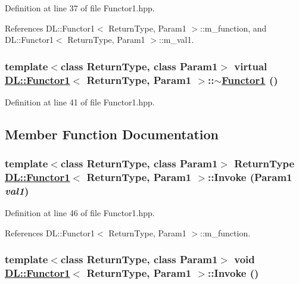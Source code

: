 Definition at line 37 of file Functor1.hpp.

References DL::Functor1$<$ Return\-Type, Param1 $>$::m\_\-function, and DL::Functor1$<$ Return\-Type, Param1 $>$::m\_\-val1.\hypertarget{classDL_1_1Functor1_a1}{
\subsubsection[$\sim$Functor1]{\setlength{\rightskip}{0pt plus 5cm}template$<$class Return\-Type, class Param1$>$ virtual \hyperlink{classDL_1_1Functor1}{DL::Functor1}$<$ Return\-Type, Param1 $>$::$\sim$\hyperlink{classDL_1_1Functor1}{Functor1} ()}}
\label{classDL_1_1Functor1_a1}




Definition at line 41 of file Functor1.hpp.

\subsection{Member Function Documentation}
\hypertarget{classDL_1_1Functor1_a3}{
\subsubsection[Invoke]{\setlength{\rightskip}{0pt plus 5cm}template$<$class Return\-Type, class Param1$>$ Return\-Type \hyperlink{classDL_1_1Functor1}{DL::Functor1}$<$ Return\-Type, Param1 $>$::Invoke (Param1 {\em val1})}}
\label{classDL_1_1Functor1_a3}




Definition at line 46 of file Functor1.hpp.

References DL::Functor1$<$ Return\-Type, Param1 $>$::m\_\-function.\hypertarget{classDL_1_1Functor1_a2}{
\subsubsection[Invoke]{\setlength{\rightskip}{0pt plus 5cm}template$<$class Return\-Type, class Param1$>$ void \hyperlink{classDL_1_1Functor1}{DL::Functor1}$<$ Return\-Type, Param1 $>$::Invoke ()}}
\label{classDL_1_1Functor1_a2}




